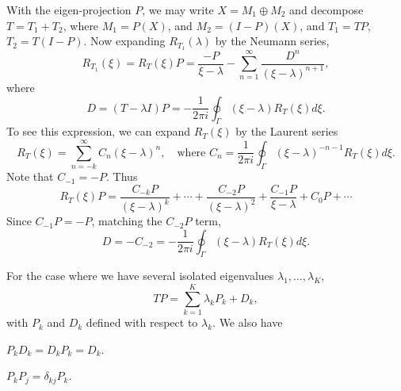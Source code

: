 \begin{remark}
    With the eigen-projection $P$, we may write $X = M_1\oplus M_2$ 
    and decompose $T = T_1 + T_2$, where $M_1 = P(X)$, 
    and $M_2 = (I-P)(X)$, and $T_1 = TP$, $T_2 = T(I-P)$. 
    Now expanding $R_{T_1}(\lambda)$ by the Neumann series, 
    \begin{equation*}
        R_{T_1}(\xi) = R_T(\xi)P = \frac{-P}{\xi - \lambda} - \sum_{n=1}^\infty \frac{D^n}{(\xi - \lambda)^{n+1}},
    \end{equation*}
    where 
    \begin{equation*}
        D = (T-\lambda I)P = -\frac{1}{2\pi i}\oint_{\Gamma}(\xi - \lambda)R_T(\xi)d\xi.
    \end{equation*}
    To see this expression, we can expand $R_T(\xi)$ by the Laurent series 
    \begin{equation*}
        R_T(\xi) = \sum_{n=-k}^\infty C_n(\xi - \lambda)^n, 
        \quad\text{where } C_n = \frac{1}{2\pi i}\oint_{\Gamma} (\xi - \lambda)^{-n-1}R_T(\xi)d\xi. 
    \end{equation*}
    Note that $C_{-1} = -P$. Thus 
    \begin{equation*}
        R_T(\xi)P = \frac{C_{-k}P}{(\xi - \lambda)^{k}} + \cdots + \frac{C_{-2}P}{(\xi-\lambda)^2} + \frac{C_{-1}P}{\xi - \lambda} + C_0P + \cdots
    \end{equation*}
    Since $C_{-1}P = -P$, matching the $C_{-2}P$ term, 
    \begin{equation*}
        D = -C_{-2} = -\frac{1}{2\pi i}\oint_{\Gamma}(\xi - \lambda)R_T(\xi)d\xi.
    \end{equation*}
\end{remark}
\begin{remark}
    For the case where we have several isolated eigenvalues $\lambda_1,\ldots,\lambda_K$, 
    \begin{equation*}
        TP = \sum_{k=1}^K \lambda_k P_k + D_k, 
    \end{equation*}
    with $P_k$ and $D_k$ defined with respect to $\lambda_k$. We also have 
    \begin{thmenum}
        \item $P_kD_k = D_kP_k = D_k$.
        \item $P_kP_j = \delta_{kj}P_k$.
    \end{thmenum}
\end{remark}

